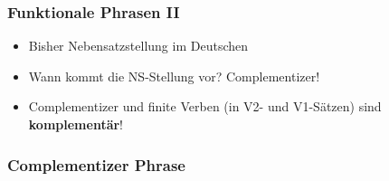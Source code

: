 \begin{frame}
\frametitle{Funktionale Phrasen II}

\begin{itemize}
	\item Bisher \ras Nebensatzstellung im Deutschen
	\item Wann kommt die NS-Stellung vor? \ras Complementizer!
	
	\eal
	\zl
	
	\item Complementizer und finite Verben (in V2- und V1-Sätzen) sind \textbf{komplementär}!
	
\end{itemize}

\end{frame}


\subsubsection{Complementizer Phrase}

